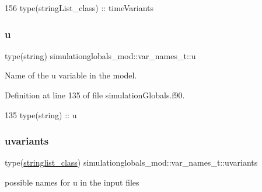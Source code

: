 \begin{DoxyCode}
156         \textcolor{keywordtype}{type}(stringList\_class) :: timeVariants
\end{DoxyCode}
\mbox{\label{structsimulationglobals__mod_1_1var__names__t_a05e03dc8cb0d9e041cd0989d4bb283f6}} 
\subsubsection{\texorpdfstring{u}{u}}
{\footnotesize\ttfamily type(string) simulationglobals\+\_\+mod\+::var\+\_\+names\+\_\+t\+::u\hspace{0.3cm}{\ttfamily [private]}}



Name of the \textquotesingle{}u\textquotesingle{} variable in the model. 



Definition at line 135 of file simulation\+Globals.\+f90.


\begin{DoxyCode}
135         \textcolor{keywordtype}{type}(string) :: u
\end{DoxyCode}
\mbox{\label{structsimulationglobals__mod_1_1var__names__t_a4a7350ba83ed451757bc06279a3ba337}} 
\subsubsection{\texorpdfstring{uvariants}{uvariants}}
{\footnotesize\ttfamily type(\mbox{\hyperlink{structsimulationglobals__mod_1_1stringlist__class}{stringlist\+\_\+class}}) simulationglobals\+\_\+mod\+::var\+\_\+names\+\_\+t\+::uvariants\hspace{0.3cm}{\ttfamily [private]}}



possible names for \textquotesingle{}u\textquotesingle{} in the input files 



